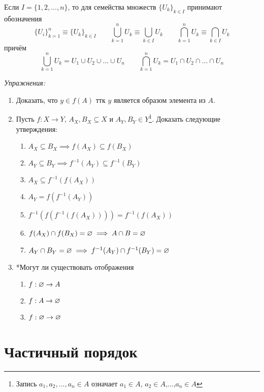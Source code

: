 Если $I=\{1,2,...,n\}$, то для семейства множеств $\{U_{k}\}_{k\in I}$ принимают
обозначения
\[
	\{U_{i}\}_{k=1}^{n}\equiv\{U_{k}\}_{k\in I}\qquad
	\bigcup_{k=1}^{n}U_{k}\equiv\bigcup_{k\in I}U_{k}\qquad
	\bigcap_{k=1}^{n}U_{k}\equiv\bigcap_{k\in I}U_{k}
\]
причём
\[
	\bigcup_{k=1}^{n}U_{k}=U_1\cup U_2\cup ...\cup U_{n}\qquad
	\bigcap_{k=1}^{n}U_{k}=U_1\cap U_2\cap ...\cap U_{n}
\]

\vspace{1em}
{\it Упражнения:}
\begin{enumerate}
	\item{}Доказать, что $y\in f(A)$ ттк $y$ является образом элемента из $A$.
	\item{}Пусть ${f:X\to Y}$, ${A_{X},B_{X}\subseteq X}$ и
		${A_{Y},B_{Y}\in Y}$\footnote{Запись $a_1,a_2,...,a_{n}\in A$ означает
		$a_1\in A$, $a_2\in A$,...,$a_{n}\in A$}.
		Доказать следующие утверждения:
		\begin{enumerate}
			\item{}$A_{X}\subseteq B_{X}\implies f(A_{X})\subseteq f(B_{X})$
			\item{}$A_{Y}\subseteq B_{Y}\implies f^{-1}(A_{Y})\subseteq f^{-1}(B_{Y})$
			\item{}$A_{X}\subseteq f^{-1}(f(A_{X}))$
			\item{}$A_{Y}=f(f^{-1}(A_{Y}))$
			\item{}$f^{-1}(f(f^{-1}(f(A_{X}))))=f^{-1}(f(A_{X}))$
			\item{}$f(A_{X})\cap f(B_{X})=\varnothing\implies A\cap B=\varnothing$
			\item{}$A_{Y}\cap B_{Y}=\varnothing\implies f^{-1}(A_{Y})\cap f^{-1}(B_{Y})=\varnothing$
		\end{enumerate}
	\item{}*Могут ли существовать отображения
		\begin{multicols}{3}
			\begin{enumerate}
				\item{}$f:\varnothing\to A$
				\item{}$f:A\to\varnothing$
				\item{}$f:\varnothing\to\varnothing$
			\end{enumerate}
		\end{multicols}
\end{enumerate}

\section{Частичный порядок}

